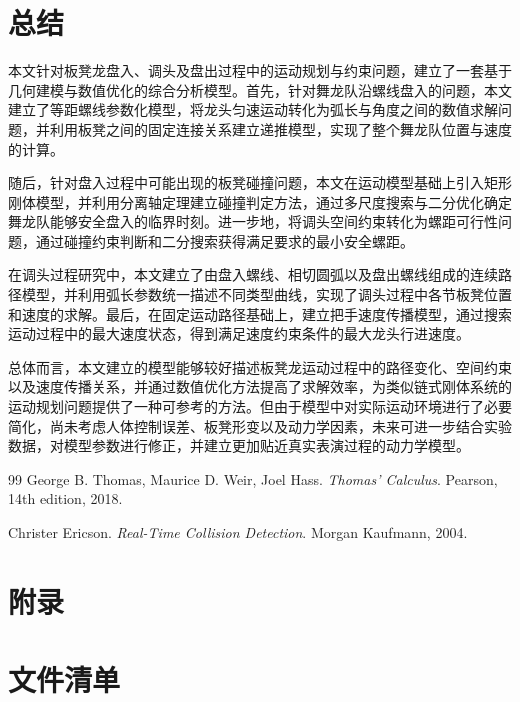 \documentclass[UTF-8,a4paper,zihao=-4]{ctexart}
\begin{document}
\section{总结}

本文针对板凳龙盘入、调头及盘出过程中的运动规划与约束问题，建立了一套基于几何建模与数值优化的综合分析模型。首先，针对舞龙队沿螺线盘入的问题，本文建立了等距螺线参数化模型，将龙头匀速运动转化为弧长与角度之间的数值求解问题，并利用板凳之间的固定连接关系建立递推模型，实现了整个舞龙队位置与速度的计算。

随后，针对盘入过程中可能出现的板凳碰撞问题，本文在运动模型基础上引入矩形刚体模型，并利用分离轴定理建立碰撞判定方法，通过多尺度搜索与二分优化确定舞龙队能够安全盘入的临界时刻。进一步地，将调头空间约束转化为螺距可行性问题，通过碰撞约束判断和二分搜索获得满足要求的最小安全螺距。

在调头过程研究中，本文建立了由盘入螺线、相切圆弧以及盘出螺线组成的连续路径模型，并利用弧长参数统一描述不同类型曲线，实现了调头过程中各节板凳位置和速度的求解。最后，在固定运动路径基础上，建立把手速度传播模型，通过搜索运动过程中的最大速度状态，得到满足速度约束条件的最大龙头行进速度。

总体而言，本文建立的模型能够较好描述板凳龙运动过程中的路径变化、空间约束以及速度传播关系，并通过数值优化方法提高了求解效率，为类似链式刚体系统的运动规划问题提供了一种可参考的方法。但由于模型中对实际运动环境进行了必要简化，尚未考虑人体控制误差、板凳形变以及动力学因素，未来可进一步结合实验数据，对模型参数进行修正，并建立更加贴近真实表演过程的动力学模型。

\begin{thebibliography}{99}   %
George B. Thomas, Maurice D. Weir, Joel Hass.
\newblock \emph{Thomas' Calculus}.
\newblock Pearson, 14th edition, 2018.

Christer Ericson.
\newblock \emph{Real-Time Collision Detection}.
\newblock Morgan Kaufmann, 2004.
\end{thebibliography}

\section*{附录}
\appendix

\section{文件清单}
\end{document}
